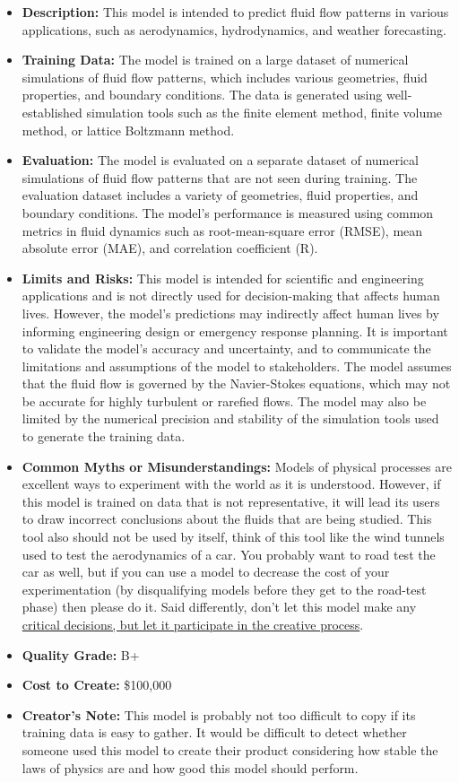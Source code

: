 \begin{itemize}
    \item \textbf{Description:} This model is intended to predict fluid flow patterns in various applications, such as aerodynamics, hydrodynamics, and weather forecasting.
    \item \textbf{Training Data:} The model is trained on a large dataset of numerical simulations of fluid flow patterns, which includes various geometries, fluid properties, and boundary conditions. The data is generated using well-established simulation tools such as the finite element method, finite volume method, or lattice Boltzmann method.
    \item \textbf{Evaluation:} The model is evaluated on a separate dataset of numerical simulations of fluid flow patterns that are not seen during training. The evaluation dataset includes a variety of geometries, fluid properties, and boundary conditions. The model's performance is measured using common metrics in fluid dynamics such as root-mean-square error (RMSE), mean absolute error (MAE), and correlation coefficient (R).
    \item \textbf{Limits and Risks:} This model is intended for scientific and engineering applications and is not directly used for decision-making that affects human lives. However, the model's predictions may indirectly affect human lives by informing engineering design or emergency response planning. It is important to validate the model's accuracy and uncertainty, and to communicate the limitations and assumptions of the model to stakeholders. The model assumes that the fluid flow is governed by the Navier-Stokes equations, which may not be accurate for highly turbulent or rarefied flows. The model may also be limited by the numerical precision and stability of the simulation tools used to generate the training data.
    \item \textbf{Common Myths or Misunderstandings:} Models of physical processes are excellent ways to experiment with the world as it is understood. However, if this model is trained on data that is not representative, it will lead its users to draw incorrect conclusions about the fluids that are being studied. This tool also should not be used by itself, think of this tool like the wind tunnels used to test the aerodynamics of a car. You probably want to road test the car as well, but if you can use a model to decrease the cost of your experimentation (by disqualifying models before they get to the road-test phase) then please do it. Said differently, don't let this model make any \hyperref[sec:creative]{critical decisions, but let it participate in the creative process}.
    \item \textbf{Quality Grade:} B+
    \item \textbf{Cost to Create:} \$100,000
    \item \textbf{Creator's Note:} This model is probably not too difficult to copy if its training data is easy to gather. It would be difficult to detect whether someone used this model to create their product considering how stable the laws of physics are and how good this model should perform. 
\end{itemize}

